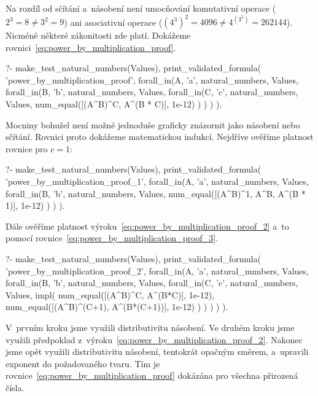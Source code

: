 Na rozdíl od sčítání a~násobení není umocňování komutativní operace (\(2^3 = 8 \neq 3^2 = 9\)) ani asociativní operace (\((4^3)^2 = 4096 \neq 4^{(3^2)} = 262144\)). Nicméně některé zákonitosti zde platí. Dokážeme rovnici~\eqref{eq:power_by_multiplication_proof}.

\begin{fact}
\begin{prolog}
?-	make_test_natural_numbers(Values),
	print_validated_formula(
		'power_by_multiplication_proof',
		forall_in(A, 'a', natural_numbers, Values,
			forall_in(B, 'b', natural_numbers, Values,
				forall_in(C, 'c', natural_numbers, Values,
					num_equal([(A^B)^C, A^(B * C)], 1e-12)
				)
			)
		)
	).
\end{prolog}
\end{fact}

Mocniny bohužel není možné jednoduše graficky znázornit jako násobení nebo sčítání. Rovnici proto dokážeme matematickou indukcí. Nejdříve ověříme platnost rovnice pro \(c = 1\):

\begin{prolog}
?-	make_test_natural_numbers(Values),
	print_validated_formula(
		'power_by_multiplication_proof_1',
		forall_in(A, 'a', natural_numbers, Values,
			forall_in(B, 'b', natural_numbers, Values,
				num_equal([(A^B)^1, A^B, A^(B * 1)], 1e-12)
			)
		)
	).
\end{prolog}

Dále ověříme platnost výroku~\eqref{eq:power_by_multiplication_proof_2} a~to pomocí rovnice~\eqref{eq:power_by_multiplication_proof_3}.

\begin{prolog}
?-	make_test_natural_numbers(Values),
	print_validated_formula(
		'power_by_multiplication_proof_2',
		forall_in(A, 'a', natural_numbers, Values,
			forall_in(B, 'b', natural_numbers, Values,
				forall_in(C, 'c', natural_numbers, Values,
					impl(
						num_equal([(A^B)^C, 	A^(B*C)], 1e-12),
						num_equal([(A^B)^(C+1), 	A^(B*(C+1))], 1e-12)
					)
				)
			)
		)
	).
\end{prolog}

V~prvním kroku jsme využili distributivitu násobení. Ve druhém kroku jsme využili předpoklad z~výroku~\eqref{eq:power_by_multiplication_proof_2}. Nakonec jsme opět využili distributivitu násobení, tentokrát opačným směrem, a~upravili exponent do požadovaného tvaru. Tím je rovnice~\eqref{eq:power_by_multiplication_proof} dokázána pro všechna přirozená čísla.

